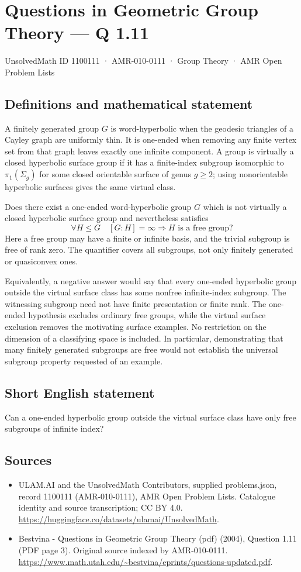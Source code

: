\documentclass[11pt,a4paper]{article}
\begin{document}
\section*{Questions in Geometric Group Theory — Q 1.11}\label{1100111}
{\small UnsolvedMath ID 1100111 · AMR-010-0111 · Group Theory · AMR Open Problem Lists}
\subsection{Definitions and mathematical statement}
A finitely generated group $G$ is word-hyperbolic when the geodesic triangles of a Cayley graph are uniformly thin. It is one-ended when removing any finite vertex set from that graph leaves exactly one infinite component. A group is virtually a closed hyperbolic surface group if it has a finite-index subgroup isomorphic to $\pi_1(\Sigma_g)$ for some closed orientable surface of genus $g\geq2$; using nonorientable hyperbolic surfaces gives the same virtual class.

Does there exist a one-ended word-hyperbolic group $G$ which is not virtually a closed hyperbolic surface group and nevertheless satisfies
\[
 \forall H\leq G\quad [G:H]=\infty
       \Longrightarrow H\text{ is a free group}?
\]
Here a free group may have a finite or infinite basis, and the trivial subgroup is free of rank zero. The quantifier covers all subgroups, not only finitely generated or quasiconvex ones.

Equivalently, a negative answer would say that every one-ended hyperbolic group outside the virtual surface class has some nonfree infinite-index subgroup. The witnessing subgroup need not have finite presentation or finite rank. The one-ended hypothesis excludes ordinary free groups, while the virtual surface exclusion removes the motivating surface examples. No restriction on the dimension of a classifying space is included. In particular, demonstrating that many finitely generated subgroups are free would not establish the universal subgroup property requested of an example.
\subsection{Short English statement}
Can a one-ended hyperbolic group outside the virtual surface class have only free subgroups of infinite index?
\subsection{Sources}
\begin{itemize}
\item[S1] ULAM.AI and the UnsolvedMath Contributors, supplied problems.json, record 1100111 (AMR-010-0111), AMR Open Problem Lists. Catalogue identity and source transcription; CC BY 4.0.
\url{https://huggingface.co/datasets/ulamai/UnsolvedMath}.
\item[S2] Bestvina - Questions in Geometric Group Theory (pdf) (2004), Question 1.11 (PDF page 3). Original source indexed by AMR-010-0111.
\url{https://www.math.utah.edu/~bestvina/eprints/questions-updated.pdf}.
\end{itemize}
\end{document}
